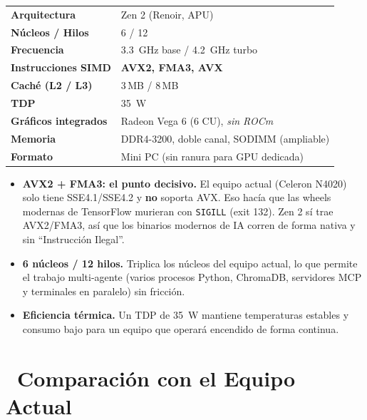 \documentclass[11pt,a4paper]{article}
\newcommand{\iconotexto}[2]{\textcolor{cyanNeon}{\faIcon{#1}}~#2}
\begin{document}
\begin{tcolorbox}[tarjetaDato, title={\faIcon{microchip}~AMD Ryzen 5 PRO 4650GE}]
\begin{tabular}{ll}
\toprule
\textbf{Arquitectura} & Zen 2 (Renoir, APU) \\
\textbf{Núcleos / Hilos} & 6 / 12 \\
\textbf{Frecuencia} & \SI{3.3}{\giga\hertz} base / \SI{4.2}{\giga\hertz} turbo \\
\textbf{Instrucciones SIMD} & \textbf{AVX2, FMA3, AVX} \\
\textbf{Caché (L2 / L3)} & 3\,MB / 8\,MB \\
\textbf{TDP} & \SI{35}{\watt} \\
\textbf{Gráficos integrados} & Radeon Vega 6 (6 CU), \emph{sin ROCm} \\
\textbf{Memoria} & DDR4-3200, doble canal, SODIMM (ampliable) \\
\textbf{Formato} & Mini PC (sin ranura para GPU dedicada) \\
\bottomrule
\end{tabular}
\end{tcolorbox}

\begin{itemize}
    \item \textbf{AVX2 + FMA3: el punto decisivo.} El equipo actual (Celeron N4020) solo
    tiene SSE4.1/SSE4.2 y \textbf{no} soporta AVX. Eso hacía que las wheels modernas de
    TensorFlow murieran con \texttt{SIGILL} (exit 132). Zen 2 sí trae AVX2/FMA3, así que
    los binarios modernos de IA corren de forma nativa y sin ``Instrucción Ilegal''.
    \item \textbf{6 núcleos / 12 hilos.} Triplica los núcleos del equipo actual, lo que
    permite el trabajo multi-agente (varios procesos Python, ChromaDB, servidores MCP y
    terminales en paralelo) sin fricción.
    \item \textbf{Eficiencia térmica.} Un TDP de \SI{35}{\watt} mantiene temperaturas
    estables y consumo bajo para un equipo que operará encendido de forma continua.
\end{itemize}

\section[Comparación con el Equipo Actual]{\iconotexto{exchange-alt}{Comparación con el Equipo Actual}}
\end{document}
